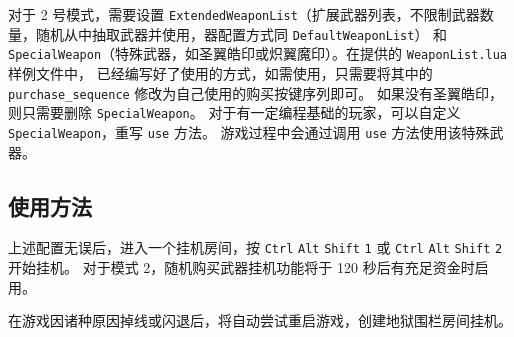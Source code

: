 对于 2 号模式，需要设置 \lstinline{ExtendedWeaponList}（扩展武器列表，不限制武器数量，随机从中抽取武器并使用，器配置方式同 \lstinline{DefaultWeaponList}）
和 \lstinline{SpecialWeapon}（特殊武器，如圣翼皓印或炽翼魔印）。在提供的 \lstinline{WeaponList.lua} 样例文件中，
已经编写好了使用的方式，如需使用，只需要将其中的 \lstinline{purchase_sequence} 修改为自己使用的购买按键序列即可。
如果没有圣翼皓印，则只需要删除 \lstinline{SpecialWeapon}。
对于有一定编程基础的玩家，可以自定义 \lstinline{SpecialWeapon}，重写 \lstinline{use} 方法。
游戏过程中会通过调用 \lstinline{use} 方法使用该特殊武器。

\subsection{使用方法}

上述配置无误后，进入一个挂机房间，按 \lstinline{Ctrl} \lstinline{Alt} \lstinline{Shift} \lstinline{1} 或 \lstinline{Ctrl} \lstinline{Alt} \lstinline{Shift} \lstinline{2} 开始挂机。
对于模式 2，随机购买武器挂机功能将于 120 秒后有充足资金时启用。

在游戏因诸种原因掉线或闪退后，将自动尝试重启游戏，创建地狱围栏房间挂机。
